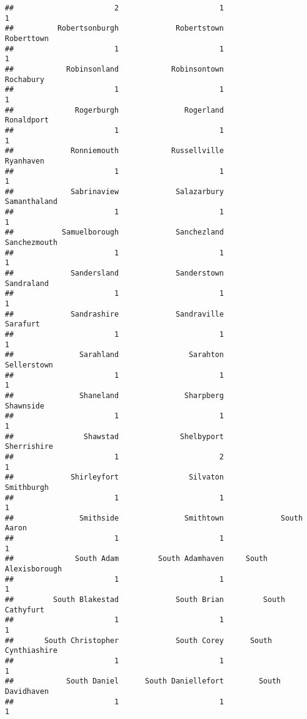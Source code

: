 \documentclass[
]{article}
\begin{document}
\begin{verbatim}
##                       2                       1                       1 
##          Robertsonburgh             Robertstown              Roberttown 
##                       1                       1                       1 
##            Robinsonland            Robinsontown               Rochabury 
##                       1                       1                       1 
##              Rogerburgh               Rogerland              Ronaldport 
##                       1                       1                       1 
##             Ronniemouth            Russellville               Ryanhaven 
##                       1                       1                       1 
##             Sabrinaview             Salazarbury            Samanthaland 
##                       1                       1                       1 
##           Samuelborough             Sanchezland            Sanchezmouth 
##                       1                       1                       1 
##             Sandersland             Sanderstown              Sandraland 
##                       1                       1                       1 
##             Sandrashire             Sandraville                Sarafurt 
##                       1                       1                       1 
##               Sarahland                Sarahton             Sellerstown 
##                       1                       1                       1 
##               Shaneland               Sharpberg               Shawnside 
##                       1                       1                       1 
##                Shawstad              Shelbyport             Sherrishire 
##                       1                       2                       1 
##             Shirleyfort                Silvaton              Smithburgh 
##                       1                       1                       1 
##               Smithside               Smithtown             South Aaron 
##                       1                       1                       1 
##              South Adam         South Adamhaven     South Alexisborough 
##                       1                       1                       1 
##         South Blakestad             South Brian         South Cathyfurt 
##                       1                       1                       1 
##       South Christopher             South Corey      South Cynthiashire 
##                       1                       1                       1 
##            South Daniel      South Daniellefort        South Davidhaven 
##                       1                       1                       1 

\end{verbatim}
\end{document}
